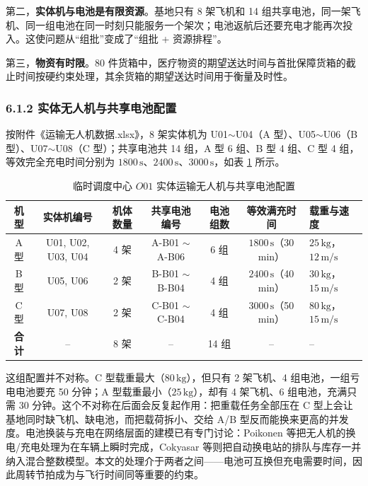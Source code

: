 \documentclass[withoutpreface,bwprint]{format}
\begin{document}
第二，\textbf{实体机与电池是有限资源}。基地只有 8 架飞机和 14 组共享电池，同一架飞机、同一组电池在同一时刻只能服务一个架次；电池返航后还要充电才能再次投入。这使问题从“组批”变成了“组批 + 资源排程”。

第三，\textbf{物资有时限}。80 件货箱中，医疗物资的期望送达时间与首批保障货箱的截止时间按硬约束处理，其余货箱的期望送达时间用于衡量及时性。

\subsubsection{6.1.2 实体无人机与共享电池配置}
按附件《运输无人机数据.xlsx》，8 架实体机为 U01$\sim$U04（A 型）、U05$\sim$U06（B 型）、U07$\sim$U08（C 型）；共享电池共 14 组，A 型 6 组、B 型 4 组、C 型 4 组，等效完全充电时间分别为 $1800\,\text{s}$、$2400\,\text{s}$、$3000\,\text{s}$，如表 \ref{tab:resources_inventory} 所示。

\begin{table}[H]
\centering
\small
\caption{临时调度中心 $O01$ 实体运输无人机与共享电池配置}
\label{tab:resources_inventory}
\begin{tabularx}{\textwidth}{c c c c c c >{\raggedright\arraybackslash}X}
\toprule
\textbf{机型} & \textbf{实体机编号} & \textbf{机体数量} & \textbf{共享电池编号} & \textbf{电池组数} & \textbf{等效满充时间} & \textbf{载重与速度} \\
\midrule
A 型 & U01, U02, U03, U04 & 4 架 & A-B01 $\sim$ A-B06 & 6 组 & $1800\,\text{s}$（30 min） & $25\,\text{kg}$，$12\,\text{m/s}$ \\
B 型 & U05, U06 & 2 架 & B-B01 $\sim$ B-B04 & 4 组 & $2400\,\text{s}$（40 min） & $30\,\text{kg}$，$15\,\text{m/s}$ \\
C 型 & U07, U08 & 2 架 & C-B01 $\sim$ C-B04 & 4 组 & $3000\,\text{s}$（50 min） & $80\,\text{kg}$，$15\,\text{m/s}$ \\
\midrule
\textbf{合计} & -- & 8 架 & -- & 14 组 & -- & -- \\
\bottomrule
\end{tabularx}
\end{table}

这组配置并不对称。C 型载重最大（$80\,\text{kg}$），但只有 2 架飞机、4 组电池，一组亏电电池要充 50 分钟；A 型载重最小（$25\,\text{kg}$），却有 4 架飞机、6 组电池，充满只需 30 分钟。这个不对称在后面会反复起作用：把重载任务全部压在 C 型上会让基地同时缺飞机、缺电池，而把载荷拆小、交给 A/B 型反而能换来更高的并发度。电池换装与充电在网络层面的建模已有专门讨论：Poikonen 等把无人机的换电/充电处理为在车辆上瞬时完成\cite{poikonen2017}，Cokyasar 等则把自动换电站的排队与库存一并纳入混合整数模型\cite{cokyasar2021}。本文的处理介于两者之间——电池可互换但充电需要时间，因此周转节拍成为与飞行时间同等重要的约束。
\end{document}
